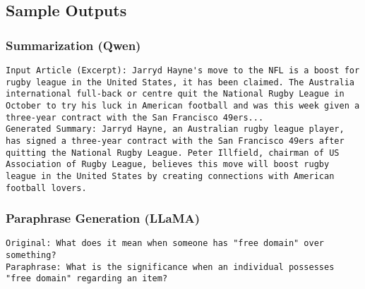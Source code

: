 \documentclass[10pt,twocolumn,letterpaper]{article}
\begin{document}
\subsection{Sample Outputs}
\subsubsection{Summarization (Qwen)}
\begin{lstlisting}[caption=Sample Summarization Output, basicstyle=\ttfamily\scriptsize]
Input Article (Excerpt): Jarryd Hayne's move to the NFL is a boost for rugby league in the United States, it has been claimed. The Australia international full-back or centre quit the National Rugby League in October to try his luck in American football and was this week given a three-year contract with the San Francisco 49ers...
Generated Summary: Jarryd Hayne, an Australian rugby league player, has signed a three-year contract with the San Francisco 49ers after quitting the National Rugby League. Peter Illfield, chairman of US Association of Rugby League, believes this move will boost rugby league in the United States by creating connections with American football lovers.
\end{lstlisting}

\subsubsection{Paraphrase Generation (LLaMA)}
\begin{lstlisting}[caption=Sample Paraphrase Outputs, basicstyle=\ttfamily\scriptsize]
Original: What does it mean when someone has "free domain" over something?
Paraphrase: What is the significance when an individual possesses "free domain" regarding an item?
\end{lstlisting}
\end{document}
